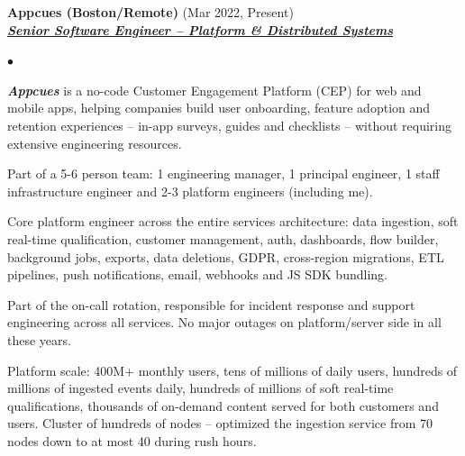 \documentclass[a4paper]{article}
\newcommand{\employer}[3]{{
  \textbf{#1} (#2)\\ \underline{\textbf{\emph{#3}}}\\ }}
\newenvironment{achievements}{\begin{list}{$\bullet$}{\topsep 0pt \itemsep
  -2pt}}{\vspace*{4pt}\end{list}}
\newcommand{\emphasys}[1]{\textbf{\emph{#1}}}
\begin{document}
  \employer{ Appcues (Boston/Remote)}{Mar 2022, Present}{Senior Software Engineer -- Platform \& Distributed Systems}
  \begin{achievements}
  \item \emphasys{Appcues} is a no-code Customer Engagement Platform (CEP) for web and mobile apps, helping companies build user onboarding, feature adoption and retention experiences -- in-app surveys, guides and checklists -- without requiring extensive engineering resources.
  \item Part of a 5-6 person team: 1 engineering manager, 1 principal engineer, 1 staff infrastructure engineer and 2-3 platform engineers (including me).
  \item Core platform engineer across the entire services architecture: data ingestion, soft real-time qualification, customer management, auth, dashboards, flow builder, background jobs, exports, data deletions, GDPR, cross-region migrations, ETL pipelines, push notifications, email, webhooks and JS SDK bundling.
  \item Part of the on-call rotation, responsible for incident response and support engineering across all services. No major outages on platform/server side in all these years.
  \item Platform scale: 400M+ monthly users, tens of millions of daily users, hundreds of millions of ingested events daily, hundreds of millions of soft real-time qualifications, thousands of on-demand content served for both customers and users. Cluster of hundreds of nodes -- optimized the ingestion service from 70 nodes down to at most 40 during rush hours.


\end{achievements}
\end{document}
